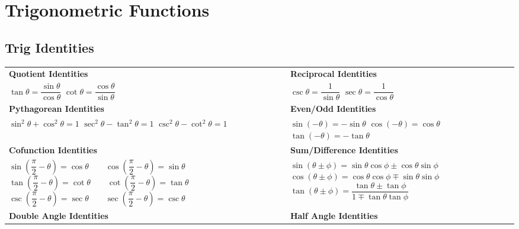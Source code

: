 \documentclass[oneside]{book}
\numberwithin{figure}{section}
\numberwithin{equation}{section}
\theoremstyle{definition}
\begin{document}
	\chapter{Trigonometric Functions}
	\section{Trig Identities}
	\bgroup
	\renewcommand\cellgape{\Gape[5pt]}
	\setlength\extrarowheight{5pt}
	\renewcommand\cellset{\renewcommand\arraystretch{2}%
		\setlength\extrarowheight{0pt}}
	\begin{tabularx}{\columnwidth}{Y Y}
		\textbf{Quotient Identities} & \textbf{Reciprocal Identities}\\
		\makecell[c]{$ \tan\theta = \dfrac{\sin\theta}{\cos\theta} $\\
			$ \cot\theta = \dfrac{\cos\theta}{\sin\theta} $} & \\
		\textbf{Pythagorean Identities} & \textbf{Even/Odd Identities}\\
		 & \makecell[c]{$ \sin(-\theta) = -\sin\theta $\\
			$ \cos(-\theta) = \cos\theta $\\
			$ \tan(-\theta) = -\tan\theta $}\\
		\textbf{Cofunction Identities} & \textbf{Sum/Difference Identities}\\
		 & \makecell[c]{$ \sin(\theta \pm \phi) = \sin\theta\cos\phi \pm \cos\theta\sin\phi $\\
			$ \cos(\theta \pm \phi) = \cos\theta\cos\phi \mp \sin\theta\sin\phi $\\
			$ \tan(\theta \pm \phi) = \dfrac{\tan\theta \pm \tan\phi}{1 \mp \tan\theta\tan\phi} $}\\
		\textbf{Double Angle Identities} & \textbf{Half Angle Identities}\\

\end{tabularx}
\end{document}
